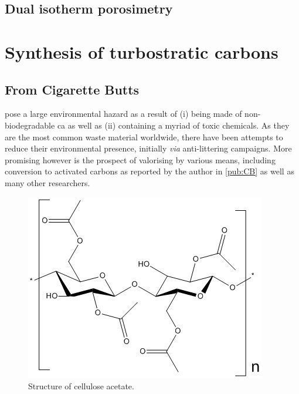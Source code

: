 \subsection{Dual isotherm porosimetry}

\section{Synthesis of turbostratic carbons}

\subsection{From Cigarette Butts}

 pose a large environmental hazard as a result of (i) being made of non-biodegradable \acrfull{ca} as well as (ii) containing a myriad of toxic chemicals.\citep{Slaughter2011, Puls2011, chevalier2018nano} As they are the most common waste material worldwide, there have been attempts to reduce their environmental presence, initially \textit{via} anti-littering campaigns.\citep{Prevention2011, Harris2011} More promising however is the prospect of valorising  by various means, including conversion to activated carbons as reported by the author in \ref{pub:CB} as well as many other researchers.\citep{Soltani, Soltani2013, lima2018, xiong2019nitrogen, Lee2014, Hamzah2017, Yu2018, Wang2016a, Koochaki2019, Bilge2019}

\begin{figure}[h]
    \centering
    \includegraphics[width=0.7\columnwidth, keepaspectratio]{4-cbs/figs/cellulose_acetate.jpg}
    \caption{Structure of cellulose acetate.}
    \label{fig:cellulose acetate}
\end{figure}

